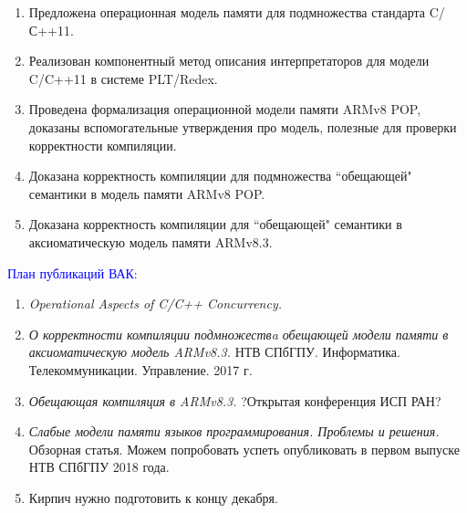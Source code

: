 {}
\begin{enumerate}
  \item Предложена операционная модель памяти для подмножества стандарта C/С++11.
  \item Реализован компонентный метод описания интерпретаторов для модели C/C++11 в системе PLT/Redex.
  \item Проведена формализация операционной модели памяти ARMv8 POP, доказаны вспомогательные утверждения про
        модель, полезные для проверки корректности компиляции.
  \item Доказана корректность компиляции для подмножества ``обещающей" \; семантики в модель памяти ARMv8 POP.
  \item Доказана корректность компиляции для ``обещающей" \; семантики в аксиоматическую модель памяти ARMv8.3.
\end{enumerate}

\textcolor{blue}{План публикаций ВАК:}
\begin{enumerate}
  \item \emph{Operational Aspects of C/C++ Concurrency.}
  

    

  \item \emph{О корректности компиляции подмножествa обещающей модели памяти в аксиоматическую модель ARMv8.3.}
    НТВ СПбГПУ. Информатика. Телекоммуникации. Управление. 2017 г.

  \item \emph{Обещающая компиляция в ARMv8.3.}
    ?Открытая конференция ИСП РАН?
    
  \item \emph{Слабые модели памяти языков программирования. Проблемы и решения.}
    Обзорная статья. Можем попробовать успеть опубликовать в первом выпуске НТВ СПбГПУ 2018 года.
    
  \item Кирпич нужно подготовить к концу декабря.
\end{enumerate}

